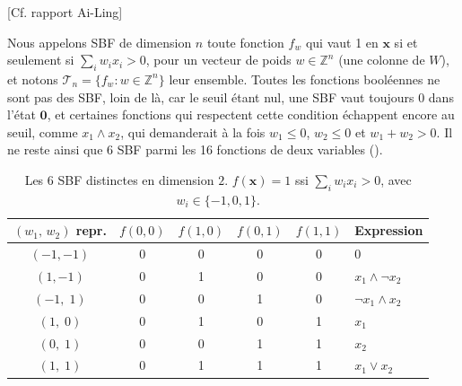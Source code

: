 \documentclass[12pt, a4paper]{article}
\begin{document}
[Cf. rapport Ai-Ling]

Nous appelons SBF de dimension $n$ toute fonction $f_w$ qui vaut 1 en $\mathbf{x}$ si et seulement si $\sum_i w_i x_i > 0$, pour un vecteur de poids $w \in \mathbb{Z}^n$ (une colonne de $W$), et notons $\mathcal{T}_n = \{ f_w : w \in \mathbb{Z}^n \}$ leur ensemble.
Toutes les fonctions booléennes ne sont pas des SBF, loin de là, car le seuil étant nul, une SBF vaut toujours 0 dans l'état $\mathbf{0}$, et certaines fonctions qui respectent cette condition échappent encore au seuil, comme $x_1 \wedge x_2$, qui demanderait à la fois $w_1 \le 0$, $w_2 \le 0$ et $w_1 + w_2 > 0$.
Il ne reste ainsi que 6 SBF parmi les 16 fonctions de deux variables ().

\begin{table}[H]
\centering
\caption{Les 6 SBF distinctes en dimension $2$. $f(\mathbf{x}) = 1$ ssi $\sum_i w_i x_i > 0$, avec $w_i \in \{-1, 0, 1\}$.}
\label{tab:sbf2}
\begin{tabular}{cccccl}
\toprule
$(w_1,\,w_2)$ repr. & $f(0,0)$ & $f(1,0)$ & $f(0,1)$ & $f(1,1)$ & Expression \\
\midrule
$(-1,-1)$ & 0 & 0 & 0 & 0 & $0$ \\
$(1,-1)$  & 0 & 1 & 0 & 0 & $x_1 \wedge \neg x_2$ \\
$(-1,\;1)$  & 0 & 0 & 1 & 0 & $\neg x_1 \wedge x_2$ \\
$(1,\;0)$   & 0 & 1 & 0 & 1 & $x_1$ \\
$(0,\;1)$   & 0 & 0 & 1 & 1 & $x_2$ \\
$(1,\;1)$   & 0 & 1 & 1 & 1 & $x_1 \vee x_2$ \\
\bottomrule
\end{tabular}
\end{table}
\end{document}
